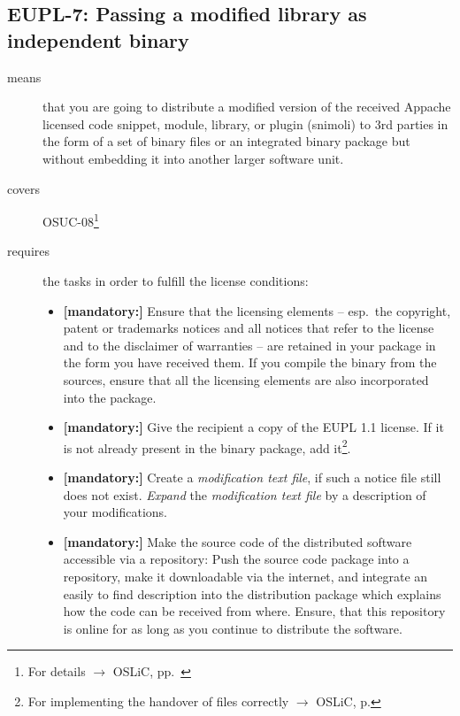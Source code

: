 \subsection{EUPL-7: Passing a modified library as independent binary}

\begin{description}
\item[means] that you are going to distribute a modified version of the received
Appache licensed code snippet, module, library, or plugin (snimoli) to 3rd
parties in the form of a set of binary files or an integrated binary package but
without embedding it into another larger software unit.
\item[covers] OSUC-08\footnote{For details $\rightarrow$ OSLiC, pp.\ \pageref{OSUC-08-DEF}}
\item[requires] the tasks in order to fulfill the license conditions:
\begin{itemize}

  \item \textbf{[mandatory:]} Ensure that the licensing elements -- esp.\ the
  copyright, patent or trademarks notices and all notices that refer to the
  license and to the disclaimer of warranties -- are retained in your package in
  the form you have received them. If you compile the binary from the sources,
  ensure that all the licensing elements are also incorporated into the package.
  
 \item \textbf{[mandatory:]} Give the recipient a copy of the EUPL 1.1
  license. If it is not already present in the binary package, add
  it\footnote{For implementing the handover of files correctly $\rightarrow$
  OSLiC, p. \pageref{DistributingFilesHint}}.

  \item \textbf{[mandatory:]} Create a \emph{modification text file}, if such a
  notice file still does not exist. \emph{Expand} the \emph{modification text
  file} by a description of your modifications.

  \item \textbf{[mandatory:]} Make the source code of the distributed software
  accessible via a repository: Push the source code package into a repository,
  make it downloadable via the internet, and integrate an easily to find
  description into the distribution package which explains how the code can be
  received from where. Ensure, that this repository is online for as long as you
  continue to distribute the software.


\end{itemize}
\end{description}
